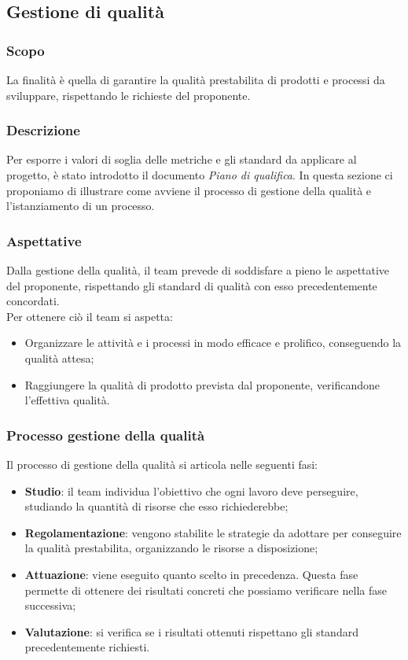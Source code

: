 \subsection{Gestione di qualità} \label{_gestioneDiQualita}

\subsubsection{Scopo}
La finalità è quella di garantire la qualità prestabilita di prodotti e processi da sviluppare, rispettando le richieste del proponente.

\subsubsection{Descrizione}
Per esporre i valori di soglia delle metriche e gli standard da applicare al progetto, è stato introdotto il documento \textit{Piano di qualifica}.
In questa sezione ci proponiamo di illustrare come avviene il processo di gestione della qualità e l'istanziamento di un processo.

\subsubsection{Aspettative}
Dalla gestione della qualità, il team prevede di soddisfare a pieno le aspettative del proponente, rispettando gli standard di qualità con esso  precedentemente concordati.\\
Per ottenere ciò il team si aspetta:
\begin{itemize}
    \item Organizzare le attività e i processi in modo efficace e prolifico, conseguendo la qualità attesa;
    \item Raggiungere la qualità di prodotto prevista dal proponente, verificandone l'effettiva qualità.
\end{itemize}


\subsubsection{Processo gestione della qualità}
Il processo di gestione della qualità si articola nelle seguenti fasi:
\begin{itemize}
    \item\textbf{Studio}: il team individua l'obiettivo che ogni lavoro deve perseguire, studiando la quantità di risorse che esso richiederebbe;
    \item \textbf{Regolamentazione}: vengono stabilite le strategie da adottare per conseguire la qualità prestabilita, organizzando le risorse a disposizione;
    \item\textbf{Attuazione}: viene eseguito quanto scelto in precedenza. Questa fase permette di ottenere dei risultati concreti che possiamo verificare nella fase successiva;
    \item\textbf{Valutazione}: si verifica se i risultati ottenuti rispettano gli standard precedentemente richiesti.
\end{itemize}


